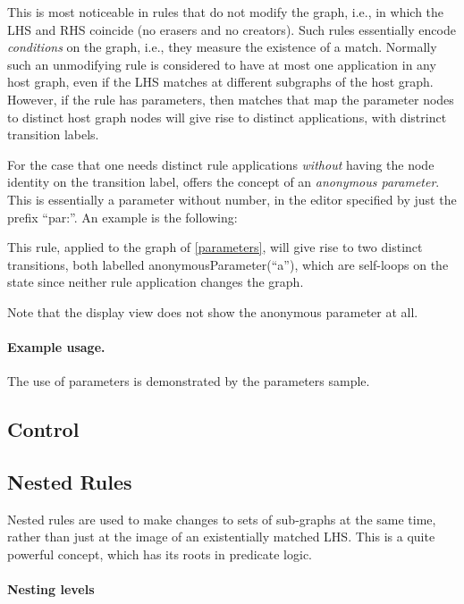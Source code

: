 This is most noticeable in rules that do not modify the graph, i.e., in which
the LHS and RHS coincide (no erasers and no creators). Such rules essentially
encode \emph{conditions} on the graph, i.e., they measure the existence of a
match. Normally such an unmodifying rule is considered to have at most one
application in any host graph, even if the LHS matches at different subgraphs of
the host graph. However, if the rule has parameters, then matches that map the
parameter nodes to distinct host graph nodes will give rise to distinct
applications, with distrinct transition labels.

For the case that one needs distinct rule applications \emph{without} having
the node identity on the transition label, \GROOVE{} offers the concept of an
\emph{anonymous parameter}. This is essentially a parameter without number, in
the editor specified by just the prefix ``\textsf{par:}''. An example is the
following:


This rule, applied to the graph of \eqref{parameters}, will give rise to two
distinct transitions, both labelled \textsf{anonymousParameter(``a'')}, which
are self-loops on the state since neither rule application changes the graph.

Note that the display view does not show the anonymous parameter at all.

\paragraph{Example usage.}

The use of parameters is demonstrated by the \GROOVE \textsf{parameters}
sample.

\subsection{Control}


\subsection{Nested Rules}

Nested rules are used to make changes to sets of sub-graphs at the same time,
rather than just at the image of an existentially matched LHS. This is a quite
powerful concept, which has its roots in predicate logic.

\paragraph{Nesting levels}

